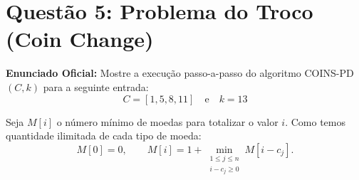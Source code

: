 \documentclass[11pt,a4paper]{article}
\begin{document}
\section*{Questão 5: Problema do Troco (Coin Change)}

\textbf{Enunciado Oficial:} Mostre a execução passo-a-passo do algoritmo \textsc{COINS-PD}$(C, k)$ para a seguinte entrada:
\[
C = [1, 5, 8, 11] \quad \text{e} \quad k = 13
\]

\begin{teoria}
Seja $M[i]$ o número mínimo de moedas para totalizar o valor $i$. Como temos quantidade ilimitada de cada tipo de moeda:
\[
M[0] = 0, \qquad M[i] = 1 + \min_{\substack{1 \le j \le n \\ i - c_j \ge 0}} M[i - c_j].
\]
\end{teoria}
\end{document}
